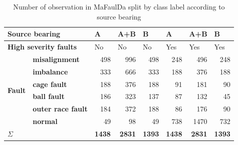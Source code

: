 \begin{table}[h]
\renewcommand{\arraystretch}{1.2}
\centering
\begin{tabular}{|ll|r|r|r|r|r|r|}
\hline
\multicolumn{2}{|l|}{\textbf{Source bearing}}                                            & \multicolumn{1}{l|}{A}  & \multicolumn{1}{l|}{A+B} & \multicolumn{1}{l|}{B}  & \multicolumn{1}{l|}{A}   & \multicolumn{1}{l|}{A+B} & \multicolumn{1}{l|}{B}   \\ \hline
\multicolumn{2}{|l|}{\textbf{High severity faults}}                                & \multicolumn{1}{l|}{No} & \multicolumn{1}{l|}{No}  & \multicolumn{1}{l|}{No} & \multicolumn{1}{l|}{Yes} & \multicolumn{1}{l|}{Yes} & \multicolumn{1}{l|}{Yes} \\ \hline
\multicolumn{1}{|l|}{\multirow{6}{*}{\textbf{Fault}}} & \textbf{misalignment}     & 498                     & 996                      & 498                     & 248                      & 496                      & 248                      \\ \cline{2-8} 
\multicolumn{1}{|l|}{}                                & \textbf{imbalance}        & 333                     & 666                      & 333                     & 188                      & 376                      & 188                      \\ \cline{2-8} 
\multicolumn{1}{|l|}{}                                & \textbf{cage fault}       & 188                     & 376                      & 188                     & 91                       & 181                      & 90                       \\ \cline{2-8} 
\multicolumn{1}{|l|}{}                                & \textbf{ball fault}       & 186                     & 323                      & 137                     & 87                       & 132                      & 45                       \\ \cline{2-8} 
\multicolumn{1}{|l|}{}                                & \textbf{outer race fault} & 184                     & 372                      & 188                     & 86                       & 176                      & 90                       \\ \cline{2-8} 
\multicolumn{1}{|l|}{}                                & \textbf{normal}           & 49                      & 98                       & 49                      & 738                      & 1470                     & 732                      \\ \hline
\multicolumn{2}{|l|}{$\Sigma$}                                                    & \textbf{1438}           & \textbf{2831}            & \textbf{1393}           & \textbf{1438}            & \textbf{2831}            & \textbf{1393}            \\ \hline
\end{tabular}
\caption{Number of observation in MaFaulDa split by class label according to source bearing}
\label{tab:design:label-count}
\end{table}

